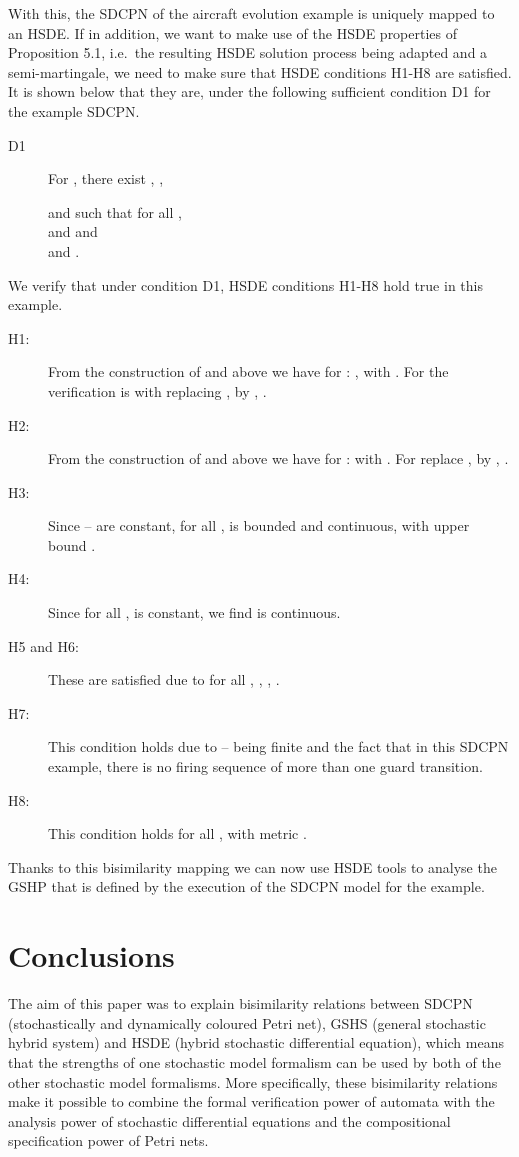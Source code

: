 \documentclass[copyright,creativecommons]{eptcs}
\begin{document}
With this, the SDCPN of the aircraft evolution example is uniquely
mapped to an HSDE. If in addition, we want to make use of the HSDE
properties of Proposition 5.1, i.e.\ the
resulting HSDE solution process being adapted and a
semi-martingale, we need to make sure that HSDE conditions H1-H8
are satisfied. It is shown below that they are, under the
following sufficient condition D1 for the example SDCPN.
\begin{description}
\item[D1] For , there exist , ,

and  such that for all ,\\
 and
 and\\
 and .
\end{description}
We verify that under condition D1, HSDE conditions H1-H8 hold true
in this example.
\begin{description}
\item[H1:] From the construction of  and  above we have for
: , with . For  the
verification is with replacing ,  by
, .

\item[H2:] From the construction of  and  above we have for
: 
with . For  replace ,  by ,
.

\item[H3:] Since -- are constant, for all
,  is bounded and continuous, with
upper bound .

\item[H4:] Since for all ,  is constant, we find  is continuous.

\item[H5 and H6:] These are satisfied due to  for all , , , .

\item[H7:] This condition holds due to --
being finite and the fact that in this SDCPN example, there is no
firing sequence of more than one guard transition. \item[H8:] This
condition holds for all , with metric .
\end{description}
Thanks to this bisimilarity mapping we can now use HSDE tools to
analyse the GSHP that is defined by the execution of the SDCPN
model for the example.


\section{Conclusions}\label{sec:conclusions}
The aim of this paper was to explain bisimilarity relations
between SDCPN (stochastically and dynamically coloured Petri net),
GSHS (general stochastic hybrid system) and HSDE (hybrid
stochastic differential equation), which means that the strengths
of one stochastic model formalism can be used by both of the other
stochastic model formalisms. More specifically, these bisimilarity
relations make it possible to combine the formal verification
power of automata with the analysis power of stochastic
differential equations and the compositional specification power
of Petri nets.
\end{document}
